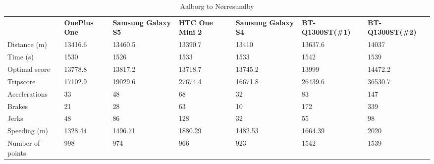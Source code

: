 \begin{table}[]
\centering
\caption{Aalborg to Nørresundby}
\label{my-label}
\begin{tabular}{|l|llllll|}
\hline
\rowcolor{tablegreen}

                 & \textbf{OnePlus One} & \textbf{Samsung Galaxy S5} & \textbf{HTC One Mini 2} & \textbf{Samsung Galaxy S4} & \textbf{BT-Q1300ST(\#1)} & \textbf{BT-Q1300ST(\#2)} \\
Distance (m)     & 13416.6     & 13460.5           & 13390.7        & 13410             & 13637.6         & 14037           \\
Time (s)         & 1530        & 1526              & 1533           & 1533              & 1542            & 1539            \\
Optimal score    & 13778.8     & 13817.2           & 13718.7        & 13745.2           & 13999           & 14472.2         \\
Tripscore        & 17102.9     & 19029.6           & 27674.4        & 16671.8           & 26439.6         & 36530.7         \\
Accelerations    & 33          & 48                & 68             & 32                & 83              & 147             \\
Brakes           & 21          & 28                & 63             & 10                & 172             & 339             \\
Jerks            & 48          & 86                & 128            & 32                & 55              & 98              \\
Speeding (m)     & 1328.44     & 1496.71           & 1880.29        & 1482.53           & 1664.39         & 2020            \\
Number of points & 998         & 974               & 966            & 923               & 1542            & 1539            \\\hline
\end{tabular}
\end{table}

